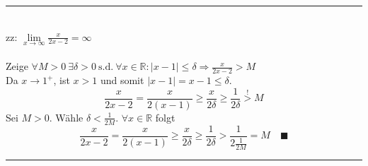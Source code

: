 \documentclass{article}
\begin{document}
\begin{itemize}
%	

\vspace{0.5cm}

\begin{minipage}{\textwidth}
{\color{blue}
\hrule
	\\
	zz: $\lim\limits_{x\rightarrow \infty} \frac{x}{2x - 2} = \infty$\\
	\\
	Zeige $\forall M > 0\ \exists\delta > 0\ \text{s.d.}\ \forall x\in\mathbb{R}: |x - 1|\leq \delta \Rightarrow \frac{x}{2x - 2} > M$\\
	Da $x\rightarrow 1^+$, ist $x>1$ und somit $|x - 1| = x - 1 \leq \delta$.
		$$\frac{x}{2x - 2} = \frac{x}{2(x - 1)} \geq \frac{x}{2\delta} \geq \frac{1}{2\delta} \stackrel{!}{>} M$$
	Sei $M > 0$. Wähle $\delta < \frac{1}{2M}$. $\forall x\in\mathbb{R}$ folgt
		$$\frac{x}{2x - 2} = \frac{x}{2(x - 1)} \geq \frac{x}{2\delta} \geq \frac{1}{2\delta} > \frac{1}{2\frac{1}{2M}} = M \quad\blacksquare$$
\hrule
}
\end{minipage}

\vspace{0.5cm}


\end{itemize}
\end{document}
